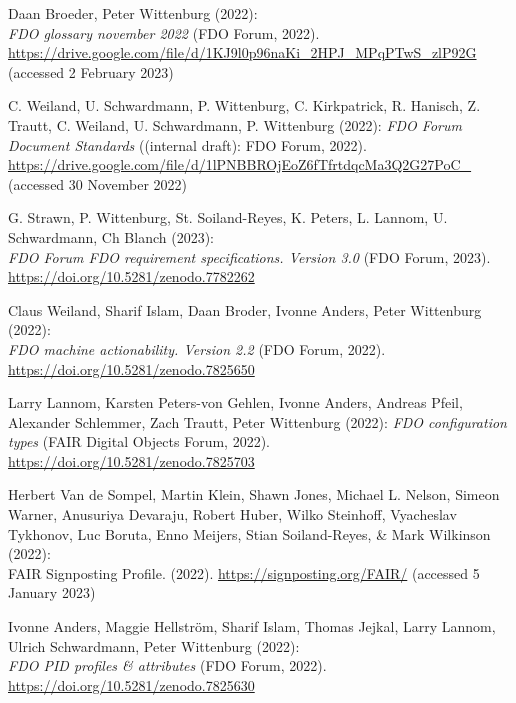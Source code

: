\begin{thebibliography}{9}
Daan Broeder, Peter Wittenburg (2022): \\
\emph{{FDO} glossary november
2022} ({FDO Forum}, 2022).
\url{https://drive.google.com/file/d/1KJ9l0p96naKi_2HPJ_MPqPTwS_zlP92G}
(accessed 2 February 2023)

C. Weiland, U. Schwardmann, P. Wittenburg, C. Kirkpatrick, R. Hanisch,
Z. Trautt, C. Weiland, U. Schwardmann, P. Wittenburg (2022):
\emph{{FDO Forum Document Standards}} ({(internal draft)}: {FDO Forum},
2022).
\url{https://drive.google.com/file/d/1lPNBBROjEoZ6fTfrtdqcMa3Q2G27PoC_}
(accessed 30 November 2022)

G. Strawn, P. Wittenburg, St. Soiland-Reyes, K. Peters, L. Lannom, U.
Schwardmann, Ch Blanch (2023): \\
\emph{{FDO Forum FDO} requirement
specifications. Version 3.0} ({FDO Forum}, 2023).
\url{https://doi.org/10.5281/zenodo.7782262}

Claus Weiland, Sharif Islam, Daan Broder, Ivonne Anders, Peter
Wittenburg (2022): \\
\emph{{FDO} machine actionability. Version 2.2} ({FDO
Forum}, 2022).
\url{https://doi.org/10.5281/zenodo.7825650}

Larry Lannom, Karsten Peters-von Gehlen, Ivonne Anders, Andreas Pfeil,
Alexander Schlemmer, Zach Trautt, Peter Wittenburg (2022):
\emph{{FDO} configuration types} ({FAIR Digital Objects Forum}, 2022).
\url{https://doi.org/10.5281/zenodo.7825703}

Herbert Van de Sompel, Martin Klein, Shawn Jones, Michael L. Nelson,
Simeon Warner, Anusuriya Devaraju, Robert Huber, Wilko Steinhoff,
Vyacheslav Tykhonov, Luc Boruta, Enno Meijers, Stian Soiland-Reyes, \&
Mark Wilkinson (2022): \\
{FAIR Signposting Profile}. (2022).
\url{https://signposting.org/FAIR/} (accessed 5 January 2023)

Ivonne Anders, Maggie Hellström, Sharif Islam, Thomas Jejkal, Larry
Lannom, Ulrich Schwardmann, Peter Wittenburg (2022): \\
\emph{{FDO PID}
profiles \& attributes} ({FDO Forum}, 2022).
\url{https://doi.org/10.5281/zenodo.7825630}


\end{thebibliography}

